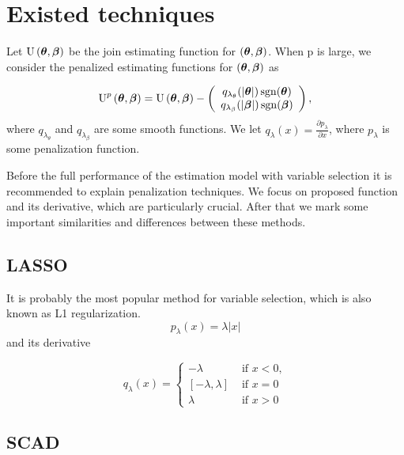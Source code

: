 \documentclass[
  letterpaper,
  DIV=11,
  numbers=noendperiod]{scrreprt}
\begin{document}
\hypertarget{existed-techniques}{%
\section{Existed techniques}\label{existed-techniques}}

Let \(\operatorname{U}\left(\boldsymbol{\theta}, \boldsymbol{\beta}\right)\) be the join
estimating function for \(\left(\boldsymbol{\theta}, \boldsymbol{\beta}\right)\). When p is
large, we consider the penalized estimating functions for
\(\left(\boldsymbol{\theta}, \boldsymbol{\beta}\right)\) as

\[
\operatorname{U}^p\left(\boldsymbol{\theta}, \boldsymbol{\beta}\right) = \operatorname{U}\left(\boldsymbol{\theta}, \boldsymbol{\beta}\right) -\left(\begin{array}{c}
q_{\lambda_\theta}(|\boldsymbol{\theta}|) \operatorname{sgn}(\boldsymbol{\theta}) \\
q_{\lambda_\beta}(|\boldsymbol{\beta}|) \operatorname{sgn}(\boldsymbol{\beta})
\end{array}\right),
\] where \(q_{\lambda_{\theta}}\) and \(q_{\lambda_{\beta}}\) are some
smooth functions. We let
\(q_{\lambda}\left(x\right) = \frac{\partial p_{\lambda}}{\partial x}\),
where \(p_{\lambda}\) is some penalization function.

Before the full performance of the estimation model with variable
selection it is recommended to explain penalization techniques. We focus
on proposed function and its derivative, which are particularly crucial.
After that we mark some important similarities and differences between
these methods.

\hypertarget{lasso}{%
\subsection{LASSO}\label{lasso}}

It is probably the most popular method for variable selection, which is
also known as L1 regularization. \[
p_{\lambda}(x) = \lambda |x|
\] and its derivative

\[
q_{\lambda}(x)= \begin{cases} - \lambda & \text { if }x < 0, \\ \left[-\lambda, \lambda\right] & \text { if } x = 0 \\ \lambda & \text { if }x > 0\end{cases}
\]

\hypertarget{scad}{%
\subsection{SCAD}\label{scad}}
\end{document}
